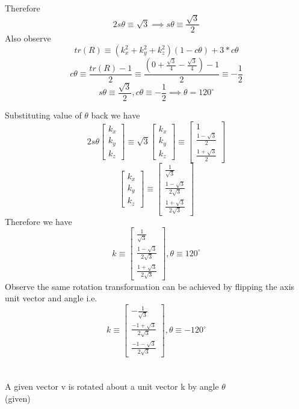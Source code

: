\documentclass[12pt]{article}
\newcommand{\given}{{\\ \color{blue} \hspace*{\fill}(given)} \\}
\begin{document}
Therefore
\[
  2s\theta \equiv \sqrt{3} \implies
  s\theta \equiv \frac{\sqrt{3}}{2}
\]
Also observe
\[
  tr(R) \equiv (k_x^2 + k_y^2 + k_z^2) (1 - c\theta) + 3 * c\theta
\]
\[
  c\theta \equiv \frac{tr(R) - 1}{2} \equiv \frac{(0 + \frac{\sqrt{3}}{4} - \frac{\sqrt{3}}{4}) - 1}{2} \equiv -\frac{1}{2}
\]
\[
  s\theta \equiv \frac{\sqrt{3}}{2}, c\theta \equiv -\frac{1}{2} \implies \theta = 120^\circ
\]

Substituting value of $\theta$ back we have
\[
  2s\theta
  \begin{bmatrix}
    k_x\\
    k_y\\
    k_z
  \end{bmatrix}
  \equiv
  \sqrt{3}
  \begin{bmatrix}
    k_x\\
    k_y\\
    k_z
  \end{bmatrix}
  \equiv
  \begin{bmatrix} 1 \\ \frac{1 - \sqrt{3}}{2} \\ \frac{1 + \sqrt{3}}{2} \end{bmatrix}
\]
\[
  \begin{bmatrix}
    k_x\\
    k_y\\
    k_z
  \end{bmatrix}
  \equiv
  \begin{bmatrix} \frac{1}{\sqrt{3}} \\ \frac{1 - \sqrt{3}}{2\sqrt{3}} \\ \frac{1 + \sqrt{3}}{2\sqrt{3}} \end{bmatrix}
\]
Therefore we have
\[
  k \equiv
  \begin{bmatrix} \frac{1}{\sqrt{3}} \\ \frac{1 - \sqrt{3}}{2\sqrt{3}} \\ \frac{1 + \sqrt{3}}{2\sqrt{3}} \end{bmatrix},
  \theta \equiv 120^\circ
\]
Observe the same rotation transformation can be achieved by flipping the axis unit vector and angle i.e.
\[
  k \equiv
  \begin{bmatrix} -\frac{1}{\sqrt{3}} \\ \frac{-1 + \sqrt{3}}{2\sqrt{3}} \\ \frac{-1 - \sqrt{3}}{2\sqrt{3}} \end{bmatrix},
  \theta \equiv -120^\circ
\]
\pagebreak

\section{}
A given vector v is rotated about a unit vector k by angle $\theta$
\given
\end{document}
